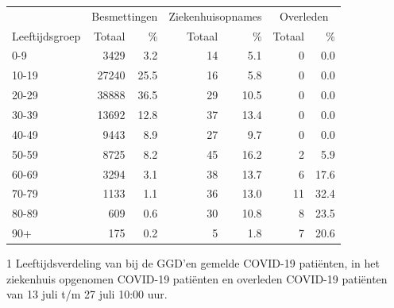\documentclass[
  english,
  man,floatsintext]{apa6}
\begin{document}
\begin{table}
\centering\begingroup\fontsize{11}{13}\selectfont

\begin{threeparttable}
\begin{tabular}{lrrrrrr}
\toprule
\multicolumn{1}{c}{ } & \multicolumn{2}{c}{Besmettingen} & \multicolumn{2}{c}{Ziekenhuisopnames} & \multicolumn{2}{c}{Overleden} \\
\cmidrule(l{3pt}r{3pt}){2-3} \cmidrule(l{3pt}r{3pt}){4-5} \cmidrule(l{3pt}r{3pt}){6-7}
Leeftijdsgroep & Totaal & \% & Totaal & \% & Totaal & \%\\
\midrule
0-9 & 3429 & 3.2 & 14 & 5.1 & 0 & 0.0\\
10-19 & 27240 & 25.5 & 16 & 5.8 & 0 & 0.0\\
20-29 & 38888 & 36.5 & 29 & 10.5 & 0 & 0.0\\
30-39 & 13692 & 12.8 & 37 & 13.4 & 0 & 0.0\\
40-49 & 9443 & 8.9 & 27 & 9.7 & 0 & 0.0\\
50-59 & 8725 & 8.2 & 45 & 16.2 & 2 & 5.9\\
60-69 & 3294 & 3.1 & 38 & 13.7 & 6 & 17.6\\
70-79 & 1133 & 1.1 & 36 & 13.0 & 11 & 32.4\\
80-89 & 609 & 0.6 & 30 & 10.8 & 8 & 23.5\\
90+ & 175 & 0.2 & 5 & 1.8 & 7 & 20.6\\
\bottomrule
\end{tabular}
\begin{tablenotes}
\item[1] Leeftijdsverdeling van bij de GGD’en gemelde COVID-19 patiënten, in het ziekenhuis opgenomen COVID-19 patiënten en overleden COVID-19 patiënten van 13 juli t/m 27 juli 10:00 uur.
\end{tablenotes}
\end{threeparttable}
\endgroup{}
\end{table}

\newpage
\end{document}
